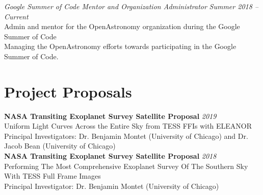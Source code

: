 \documentclass[10pt]{article}
\begin{document}
\begin{titlepage}
\emph{Google Summer of Code Mentor and Organization Administrator} \hfill \textit{Summer 2018 -- Current}
\\Admin and mentor for the OpenAstronomy organization during the Google Summer of Code
\\ {\small Managing the OpenAstronomy efforts towards participating in the Google Summer of Code.}
\vspace{.5cm}


\section*{Project Proposals}
    \textbf{NASA Transiting Exoplanet Survey Satellite Proposal}
    \hfill \textit{2019}\\
    Uniform Light Curves Across the Entire Sky from TESS FFIs with ELEANOR\\
    {\small Principal Investigators: Dr. Benjamin Montet (University of Chicago) and Dr. Jacob Bean (University of Chicago)}\\

    \textbf{NASA Transiting Exoplanet Survey Satellite Proposal}
    \hfill \textit{2018}\\
    Performing The Most Comprehensive Exoplanet Survey Of The Southern Sky With TESS Full Frame Images\\
    {\small Principal Investigator: Dr. Benjamin Montet (University of Chicago)}


\end{titlepage}
\end{document}
